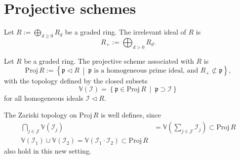 \section{Projective schemes}
\begin{defn}
	Let $R := \bigoplus_{d \geq 0} R_d$ be a graded ring.
	The irrelevant ideal of $R$ is
	\begin{equation}
	R_+ := \bigoplus_{d > 0} R_d
	.\end{equation} 
\end{defn}

\begin{defn}
	Let $R$ be a graded ring.
	The projective scheme associated with $R$ is
	\begin{equation}
	\mathrm{Proj}\, R := \left\{ \mathfrak{p} \triangleleft R \ \middle|\ 
	\mathfrak{p} \text{ is a homogeneous prime ideal, and } R_+ \not\subset \mathfrak{p} \right\}
	,\end{equation} 
	with the topology defined by the closed subsets
	\begin{equation}
	\mathbb{V}\left( \mathcal{I} \right) =
	\left\{ \mathfrak{p} \in \mathrm{Proj}\, R \ \middle|\ \mathfrak{p} \supset \mathcal{I} \right\}
	\end{equation} 
	for all homogeneous ideals $\mathcal{I} \triangleleft R$.
\end{defn}

\begin{rem}[]
	The Zariski topology on $\mathrm{Proj}\, R$ is well defines, since
	\begin{align}
		\bigcap_{j \in \mathcal{J}} \mathbb{V}\left( \mathcal{I}_j \right) &=
	\mathbb{V}\left( \sum_{j \in \mathcal{J}}^{} \mathcal{I}_j \right) \subset \mathrm{Proj}\, R\\
	\mathbb{V}\left( \mathcal{I}_1 \right) \cup \mathbb{V}\left( \mathcal{I}_2 \right) =
	\mathbb{V}\left( \mathcal{I}_1 \cdot \mathcal{I}_2 \right) \subset \mathrm{Proj}\, R
	\end{align} 
	also hold in this new setting.
\end{rem}


